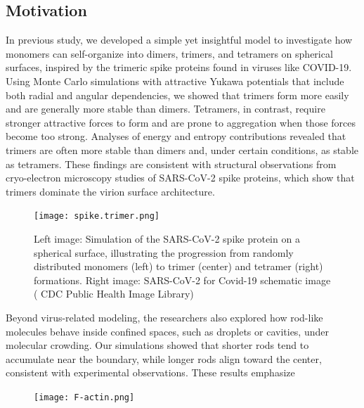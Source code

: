 \documentclass[12pt]{article}
\begin{document}
\begin{flushleft}
\section*{Motivation}
In previous study, we developed a simple yet insightful model to investigate how monomers can self-organize into dimers, trimers, and tetramers on spherical surfaces, inspired by the trimeric spike proteins found in viruses like COVID-19. Using Monte Carlo simulations with attractive Yukawa potentials that include both radial and angular dependencies, we showed that trimers form more easily and are generally more stable than dimers. Tetramers, in contrast, require stronger attractive forces to form and are prone to aggregation when those forces become too strong. Analyses of energy and entropy contributions revealed that trimers are often more stable than dimers and, under certain conditions, as stable as tetramers. These findings are consistent with structural observations from cryo-electron microscopy studies of SARS-CoV-2 spike proteins, which show that trimers dominate the virion surface architecture\cite{Ke2020}.

\begin{figure}[!ht]
  \centering
  \texttt{[image: spike.trimer.png]}
  \caption{Left image: Simulation of the SARS-CoV-2 spike protein on a spherical surface, illustrating the progression from randomly distributed monomers (left) to trimer (center) and tetramer (right) formations. Right image: SARS-CoV-2 for Covid-19 schematic image ( CDC Public
Health Image Library) \cite{cdc-covid}}
\end{figure}

Beyond virus-related modeling, the researchers also explored how rod-like molecules
behave inside confined spaces, such as droplets or cavities, under molecular crowding. Our simulations showed that shorter rods tend to accumulate near the boundary, while longer rods align toward the center, consistent with experimental observations. These results emphasize

\begin{figure}[!ht]
  \centering
   \texttt{[image: F-actin.png]}
 

\end{figure}
\end{flushleft}
\end{document}
